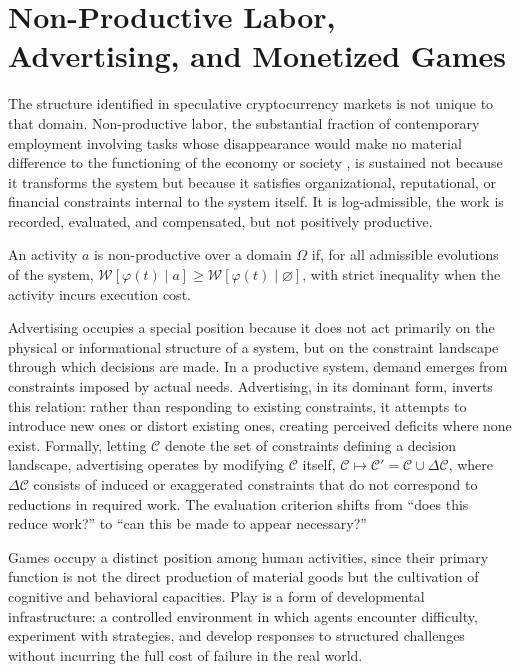 \section{Non-Productive Labor, Advertising, and Monetized Games}

The structure identified in speculative cryptocurrency markets is not unique to that domain. Non-productive labor, the substantial fraction of contemporary employment involving tasks whose disappearance would make no material difference to the functioning of the economy or society \cite{graeber2018}, is sustained not because it transforms the system but because it satisfies organizational, reputational, or financial constraints internal to the system itself. It is log-admissible, the work is recorded, evaluated, and compensated, but not positively productive.

\begin{definition}
An activity $a$ is non-productive over a domain $\Omega$ if, for all admissible evolutions of the system, $\mathcal{W}[\varphi(t) \mid a] \geq \mathcal{W}[\varphi(t) \mid \varnothing]$, with strict inequality when the activity incurs execution cost.
\end{definition}

Advertising occupies a special position because it does not act primarily on the physical or informational structure of a system, but on the constraint landscape through which decisions are made. In a productive system, demand emerges from constraints imposed by actual needs. Advertising, in its dominant form, inverts this relation: rather than responding to existing constraints, it attempts to introduce new ones or distort existing ones, creating perceived deficits where none exist. Formally, letting $\mathcal{C}$ denote the set of constraints defining a decision landscape, advertising operates by modifying $\mathcal{C}$ itself, $\mathcal{C} \mapsto \mathcal{C}' = \mathcal{C} \cup \Delta\mathcal{C}$, where $\Delta\mathcal{C}$ consists of induced or exaggerated constraints that do not correspond to reductions in required work. The evaluation criterion shifts from ``does this reduce work?'' to ``can this be made to appear necessary?''

Games occupy a distinct position among human activities, since their primary function is not the direct production of material goods but the cultivation of cognitive and behavioral capacities. Play is a form of developmental infrastructure: a controlled environment in which agents encounter difficulty, experiment with strategies, and develop responses to structured challenges without incurring the full cost of failure in the real world.

